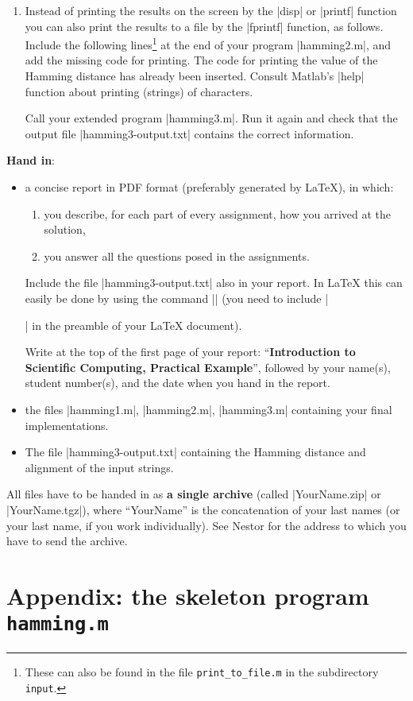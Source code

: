 \documentclass[a4paper,11pt,twoside]{article}
\newcounter{lab}[section]
\newcommand{\isc}{Introduction to Scientific Computing\xspace}
\newcommand{\tx}[1]{\texttt{#1}}
\begin{document}
\begin{Exercise}[title={Hamming distance of two DNA sequences (10)}]
\begin{enumerate}[leftmargin=*]
\item Instead of printing the results on the screen by the \vb|disp|
  or \vb|printf| function you can also print the results to a file by
  the \vb|fprintf| function, as follows. Include the following
  lines\footnote{These can also be found in the file
    \tx{print\_to\_file.m} in the subdirectory \tx{input}.}  at the
  end of your program \vb|hamming2.m|, and add the missing code for
  printing. The code for printing the value of the Hamming distance
  has already been inserted. Consult Matlab's \vb|help| function about
  printing (strings) of characters.

 

Call your extended program \vb|hamming3.m|. Run it again and check
that the output file \vb|hamming3-output.txt| contains the correct
information.

\end{enumerate}
\end{Exercise}

\textbf{Hand in}: 
\begin{itemize}
\item a concise report in PDF format (preferably generated by LaTeX),
  in which:
\begin{enumerate}[leftmargin=*, label=\textbf{\alph*.}, noitemsep] 
\item you describe, for each part of every assignment, how you arrived
  at the solution,
\item you answer all the questions posed in the assignments.
\end{enumerate}
Include the file \vb|hamming3-output.txt| also in your report. In
LaTeX this can easily be done by using the command
\vb|| (you need to include
\vb|\usepackage{verbatim}| in the preamble of your LaTeX document).

Write at the top of the first page of your report: ``\textbf{\isc,
  Practical Example}'', followed by your name(s), student number(s), and the date
when you hand in the report.
  
\item the files \vb|hamming1.m|, \vb|hamming2.m|, \vb|hamming3.m|
  containing your final implementations.

\item The file \vb|hamming3-output.txt| containing the Hamming
  distance and alignment of the input strings. 

\end{itemize}
All files have to be handed in as \textbf{a single archive}
(called \vb|YourName.zip| or \vb|YourName.tgz|), where ``YourName'' is
the concatenation of your last names (or your last name, if you work
individually). See Nestor for the address to which you have to send
the archive.



\newpage
\section*{Appendix: the skeleton program \texttt{hamming.m}}
\label{page:M-skelet}
{\small }
\end{document}
